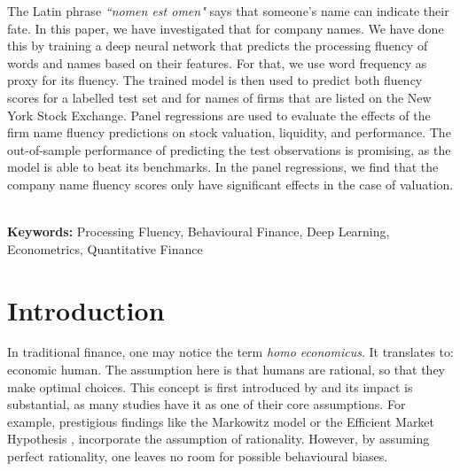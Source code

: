 \documentclass[11pt]{article}
\begin{document}
\begin{titlepage}
\begin{center}
   \end{center}
   The Latin phrase \textit{``nomen est omen"} says that someone's name can indicate their fate. In this paper, we have investigated that for company names. We have done this by training a deep neural network that predicts the processing fluency of words and names based on their features. For that, we use word frequency as proxy for its fluency. The trained model is then used to predict both fluency scores for a labelled test set and for names of firms that are listed on the New York Stock Exchange. Panel regressions are used to evaluate the effects of the firm name fluency predictions on stock valuation, liquidity, and performance. The out-of-sample performance of predicting the test observations is promising, as the model is able to beat its benchmarks.
   In the panel regressions, we find that the company name fluency scores only have significant effects in the case of valuation.


   
\noindent
\\
\small
\textbf{Keywords:} Processing Fluency, Behavioural Finance, Deep Learning, Econometrics, Quantitative Finance

\end{titlepage}



\newpage
\tableofcontents

\newpage
\listoffigures

\newpage
\listoftables







\newpage
\section{Introduction}
In traditional finance, one may notice the term \textit{homo economicus}. It translates to: economic human. The assumption here is that humans are rational, so that they make optimal choices. This concept is first introduced by \cite{mill1874essays} and its impact is substantial, as many studies have it as one of their core assumptions. For example, prestigious findings like the Markowitz model \citep{markowitz} or the Efficient Market Hypothesis \citep{fama1970efficient}, incorporate the assumption of rationality. However, by assuming perfect rationality, one leaves no room for possible behavioural biases. 
\end{document}
